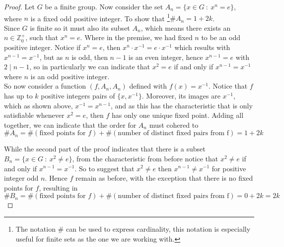 \begin{assignment}[
  header=HeaderA,
  body=BodyA,
  title={Homework 1},
  duedate={3-February-2026},
  toc=false,
  toctitle={This appears on the Table of contents.},
  exlist=false
]
\begin{exer}[Problem 2.37]
\end{exer}
\begin{proof}
Let $G$ be a finite group. Now consider the set
$A_n = \{ x \in G \ : \ x^n = e \}$, where $n$ is a fixed odd positive integer.  To show that \footnote{The notation $\#$ can be used to express cardinality, this notation is especially useful for finite sets as the one we are working with.}$\#A_n = 1 + 2k$.\\

Since $G$ is finite so it must also its subset $A_n$, which means there exists an $n \in \mathbb{Z}_0^+$, such that $x^n = e$. Where in the premise, we had fixed $n$ to be an odd positive integer. Notice if $x^{n} = e$, then $x^{n}\cdot x^{-1} = e\cdot x^{-1}$ which results with $x^{n-1} = x^{-1}$, but as $n$ is odd, then $n-1$ is an even integer, hence $x^{n-1} = e$ with $2\mid n-1$, so in particularly we can indicate that $x^2 = e$ if and only if $x^{n-1} = x^{-1}$ where $n$ is an odd positive integer.\\   

So now consider a function $(f, A_n, A_n)$ defined with $f(x) = x^{-1}$. Notice that $f$ has up to $k$ positive integers pairs of $\{x,x^{-1}\}$. Moreover, its images are $x^{-1}$, which as shown above, $x^{-1} = x^{n-1}$, and as this has the characteristic that is only satisfiable whenever $x^2 = e$, then $f$ has only one unique fixed point. Adding all together, we can indicate that the order for $A_n$ must cohered to
\[
\#A_n = \#(\text{fixed points for } f) + \#(\text{number of distinct fixed pairs from f}) = 1 + 2k
\]

While the second part of the proof indicates that there is a subset $B_n = \{x \in G \ : \ x^2 \neq e\}$, from the characteristic from before notice that $x^2 \neq e$ if and only if $x^{n-1} = x^{-1}$. So to suggest that $x^2\neq e$ then $x^{n-1} \neq x^{-1}$ for positive integer odd $n$. Hence $f$  remain as before, with the exception that there is no fixed points for $f$, resulting in
\[
\#B_n = \#(\text{fixed points for } f) + \#(\text{number of distinct fixed pairs from f}) = 0 + 2k = 2k
\]





\end{proof}



\end{assignment}
